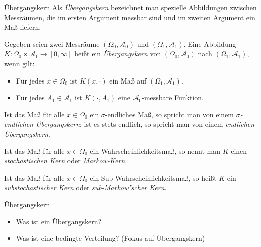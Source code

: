 \begin{defi}{Übergangskern}
    Als \emph{Übergangskern} bezeichnet man spezielle Abbildungen zwischen Messräumen, die im ersten Argument messbar sind und im zweiten Argument ein Maß liefern.

    Gegeben seien zwei Messräume $(\Omega_0, \mathcal{A}_0)$ und $(\Omega_1, \mathcal{A}_1)$.
    Eine Abbildung $K: \Omega_0 \times \mathcal{A}_1 \to [0, \infty]$ heißt ein \emph{Übergangskern} von $(\Omega_0, \mathcal{A}_0)$ nach $(\Omega_1, \mathcal{A}_1)$, wenn gilt:
    \begin{itemize}
        \item Für jedes $x \in \Omega_0$ ist $K(x, \cdot)$ ein Maß auf $(\Omega_1, \mathcal{A}_1)$.
        \item Für jedes $A_1 \in \mathcal{A}_1$ ist $K(\cdot, A_1)$ eine $\mathcal{A}_0$-messbare Funktion.
    \end{itemize}

    Ist das Maß für alle $x \in \Omega_0$ ein $\sigma$-endliches Maß, so spricht man von einem \emph{$\sigma$-endlichen Übergangskern}; ist es stets endlich, so spricht man von einem \emph{endlichen Übergangskern}.

    Ist das Maß für alle $x\in \Omega_{0}$ ein Wahrscheinlichkeitsmaß, so nennt man $K$ einen \emph{stochastischen Kern} oder \emph{Markow-Kern}.

    Ist das Maß für alle $x\in \Omega_{0}$ ein Sub-Wahrscheinlichkeitsmaß, so heißt $K$ ein \emph{substochastischer Kern} oder \emph{sub-Markow'scher Kern}.
\end{defi}

\begin{info}{Übergangskern}
    \begin{itemize}
        \item Was ist ein Übergangskern?
        \item Was ist eine bedingte Verteilung? (Fokus auf Übergangskern)
    \end{itemize}
\end{info}

